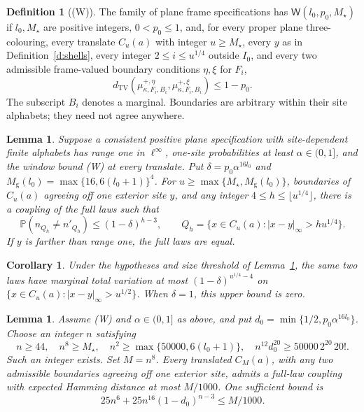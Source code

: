 \documentclass[11pt,reqno]{amsart}
\newtheorem{lemma}[theorem]{Lemma}
\newtheorem{corollary}[theorem]{Corollary}
\theoremstyle{definition}
\newtheorem{definition}[theorem]{Definition}
\theoremstyle{remark}
\begin{document}
\begin{definition}[(W)]\label{d:W}
The family of plane frame specifications has \(\mathsf W(l_0,p_0,M_\star)\)
if \(l_0,M_\star\) are positive integers, \(0<p_0\le1\), and,
for every proper plane three-colouring, every translate \(C_u(a)\)
with integer \(u\ge M_\star\), every \(y\) as in Definition~\ref{d:shells},
every integer \(2\le i\le u^{1/4}\) outside \(I_0\), and every two
admissible frame-valued boundary conditions \(\eta,\xi\) for \(F_i\),
\[
 d_{\mathrm{TV}}\!\left(
       \mu^{+,\eta}_{\kappa,F_i,B_i},
       \mu^{+,\xi}_{\kappa,F_i,B_i}\right)\le1-p_0 .
\]
The subscript \(B_i\) denotes a marginal. Boundaries are arbitrary
within their site alphabets; they need not agree anywhere.
\end{definition}

\begin{lemma}\label{l:stopped}
Suppose a consistent positive plane specification with site-dependent
finite alphabets has range one in \(\ell^\infty\), one-site probabilities
at least \(\alpha\in(0,1]\), and the window bound (W) at every translate.
Put \(\delta=p_0\alpha^{16l_0}\) and
\(M_{\mathrm g}(l_0)=\max\{16,6(l_0+1)\}^4\).
For \(u\ge\max\{M_\star,M_{\mathrm g}(l_0)\}\), boundaries of \(C_u(a)\)
agreeing off one exterior site \(y\), and any integer
\(4\le h\le\lfloor u^{1/4}\rfloor\), there is a coupling of the
full laws such that
\[
 \mathbb P(n_{Q_h}\ne n'_{Q_h})\le(1-\delta)^{h-3},
 \qquad Q_h=\{x\in C_u(a):|x-y|_\infty>hu^{1/4}\}.
\]
If \(y\) is farther than range one, the full laws are equal.
\end{lemma}

\begin{corollary}\label{p:surgery}
Under the hypotheses and size threshold of Lemma~\ref{l:stopped},
the same two laws have marginal total variation at most
\((1-\delta)^{u^{1/4}-4}\) on
\(\{x\in C_u(a):|x-y|_\infty>u^{1/2}\}\).
When \(\delta=1\), this upper bound is zero.
\end{corollary}

\begin{lemma}\label{l:hamming}
Assume (W) and \(\alpha\in(0,1]\) as above, and put
\(d_0=\min\{1/2,p_0\alpha^{16l_0}\}\).
Choose an integer \(n\) satisfying
\[
 n\ge44,\quad n^8\ge M_\star,\quad
 n^2\ge\max\{50000,6(l_0+1)\},\quad
 n^{12}d_0^{20}\ge50000\,2^{20}\,20!.
\]
Such an integer exists. Set \(M=n^8\).
Every translated \(C_M(a)\), with any two admissible boundaries
agreeing off one exterior site, admits a full-law coupling with
expected Hamming distance at most \(M/1000\).
One sufficient bound is
\[
 25n^6+25n^{16}(1-d_0)^{n-3}\le M/1000.
\]
\end{lemma}
\end{document}
